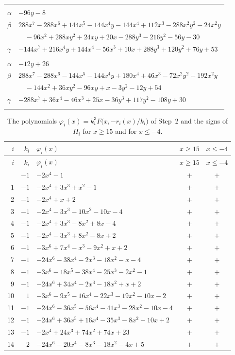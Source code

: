 \documentclass[11pt]{article}
\begin{document}
\begin{longtable}{@{}ll@{}}
\addlinespace[3pt]
\multicolumn{2}{@{}l}{$\{i,j\}=\{10,14\}$, $k_{ij}=3\cdot 5$}\\
$\alpha$ & $-96y-8$\\
$\beta$ & $288x^{7}-288x^{6}+144x^{5}-144x^{4}y-144x^{4}+112x^{3}-288x^{2}y^{2}-24x^{2}y$\\
 & $\quad -96x^{2}+288xy^{2}+24xy+20x-288y^{3}-216y^{2}-56y-30$\\
$\gamma$ & $-144x^{7}+216x^{4}y+144x^{4}-56x^{3}+10x+288y^{3}+120y^{2}+76y+53$\\
\addlinespace[3pt]
\multicolumn{2}{@{}l}{$\{i,j\}=\{11,12\}$, $k_{ij}=2\cdot 5^{2}$}\\
$\alpha$ & $-12y+26$\\
$\beta$ & $288x^{7}-288x^{6}-144x^{5}-144x^{4}y+180x^{4}+46x^{3}-72x^{2}y^{2}+192x^{2}y$\\
 & $\quad -144x^{2}+36xy^{2}-96xy+x-3y^{2}-12y+54$\\
$\gamma$ & $-288x^{7}+36x^{4}-46x^{3}+25x-36y^{3}+117y^{2}-108y+30$\\
\addlinespace[3pt]
\end{longtable}
\endgroup

\begingroup\footnotesize
\setlength{\LTcapwidth}{\textwidth}
\begin{longtable}{@{}rrlcc@{}}
\caption{The polynomials $\varphi_i(x)=k_i^3F\bigl(x,-r_i(x)/k_i\bigr)$ of Step~2 and the signs of $H_i$ for $x\geq15$ and for $x\leq-4$.}\label{tab:phi}\\
\hline $i$ & $k_i$ & $\varphi_i(x)$ & $x\geq15$ & $x\leq-4$\\\hline\endfirsthead\hline $i$ & $k_i$ & $\varphi_i(x)$ & $x\geq15$ & $x\leq-4$\\\hline\endhead\hline\endfoot
0 & $-1$ & $-2x^{4}-1$ & $+$ & $+$\\
1 & $-1$ & $-2x^{4}+3x^{3}+x^{2}-1$ & $+$ & $+$\\
2 & $-1$ & $-2x^{4}+x+2$ & $+$ & $+$\\
3 & $-1$ & $-2x^{4}-3x^{3}-10x^{2}-10x-4$ & $+$ & $+$\\
4 & $-1$ & $-2x^{4}+3x^{3}-8x^{2}+8x-4$ & $+$ & $+$\\
5 & $-1$ & $-2x^{4}-3x^{3}+8x^{2}-8x+2$ & $+$ & $+$\\
6 & $-1$ & $-3x^{6}+7x^{4}-x^{3}-9x^{2}+x+2$ & $+$ & $+$\\
7 & $-1$ & $-24x^{6}-38x^{4}-2x^{3}-18x^{2}-x-4$ & $+$ & $+$\\
8 & $-1$ & $-3x^{6}-18x^{5}-38x^{4}-25x^{3}-2x^{2}-1$ & $+$ & $+$\\
9 & $-1$ & $-24x^{6}+34x^{4}-2x^{3}-18x^{2}+x+2$ & $+$ & $+$\\
10 & $1$ & $-3x^{6}-9x^{5}-16x^{4}-22x^{3}-19x^{2}-10x-2$ & $+$ & $+$\\
11 & $-1$ & $-24x^{6}-36x^{5}-56x^{4}-41x^{3}-28x^{2}-10x-4$ & $+$ & $+$\\
12 & $-1$ & $-24x^{6}+36x^{5}+16x^{4}-35x^{3}-8x^{2}+10x+2$ & $+$ & $+$\\
13 & $-1$ & $-2x^{4}+24x^{3}+74x^{2}+74x+23$ & $+$ & $+$\\
14 & $2$ & $-24x^{6}-20x^{4}-8x^{3}-18x^{2}-4x+5$ & $+$ & $+$\\
\end{longtable}
\endgroup
\end{document}
